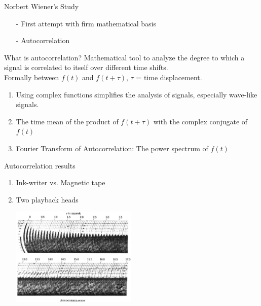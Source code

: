 \documentclass[xetex,notheorems,hyperref={pdfpagelabels=true},xcolor=table]{beamer}
\theoremstyle{plain}
\theoremstyle{definition}
\theoremstyle{example}
\theoremstyle{example}
\begin{document}
\begin{frame}{Norbert Wiener's Study}
    \begin{itemize}
        \item[-] First attempt with firm mathematical basis
        \item[-] Autocorrelation
    
    \end{itemize}
    \begin{block}{What is autocorrelation?}
        Mathematical tool to analyze the degree to which a signal is correlated to itself over different time shifts.\\ Formally between $f(t)$ and $f(t + \tau)$, $\tau$ = time displacement.
    \end{block}

    \begin{enumerate}
        \item Using complex functions simplifies the analysis of signals, especially wave-like signals.
        \item The time mean of the product of $f(t + \tau)$ with the complex conjugate of $f(t)$
        \item Fourier Transform of Autocorrelation: The power spectrum of $f(t)$
        
    \end{enumerate}
\end{frame}

\begin{frame}{Autocorrelation results}
 \begin{enumerate}
        \item Ink-writer vs. Magnetic tape
        \item Two playback heads
        \begin{center}
            \includegraphics[width = 6cm]{png/autocorrelation.png}
        \end{center}
        
    \end{enumerate}
    
\end{frame}
\end{document}
